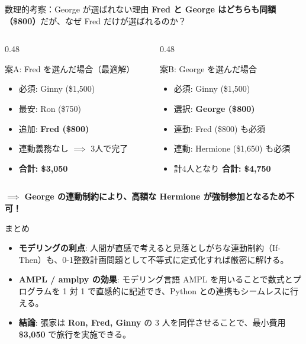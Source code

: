 \documentclass[aspectratio=169,11pt]{beamer}
\begin{document}
\begin{frame}{数理的考察：George が選ばれない理由}
  \textbf{Fred と George はどちらも同額（\$800）}だが、なぜ Fred だけが選ばれるのか？

  \begin{columns}[T]
    \begin{column}{0.48\textwidth}
      \begin{exampleblock}{案A: Fred を選んだ場合（最適解）}
        \begin{itemize}\footnotesize
          \item 必須: Ginny (\$1,500)
          \item 最安: Ron (\$750)
          \item 追加: \textbf{Fred (\$800)}
          \item 連動義務なし $\implies$ 3人で完了
          \item \textbf{合計: \$3,050}
        \end{itemize}
      \end{exampleblock}
    \end{column}
    \begin{column}{0.48\textwidth}
      \begin{alertblock}{案B: George を選んだ場合}
        \begin{itemize}\footnotesize
          \item 必須: Ginny (\$1,500)
          \item 選択: \textbf{George (\$800)}
          \item 連動: \alert{Fred (\$800) も必須}
          \item 連動: \alert{Hermione (\$1,650) も必須}
          \item 計4人となり \textbf{合計: \$4,750}
        \end{itemize}
      \end{alertblock}
    \end{column}
  \end{columns}

  \vspace{0.15cm}
  \centering
  \footnotesize
  \textbf{$\implies$ George の連動制約により、高額な Hermione が強制参加となるため不可！}
\end{frame}

\begin{frame}{まとめ}
  \begin{itemize}
    \item \textbf{モデリングの利点}:
      人間が直感で考えると見落としがちな連動制約（If-Then）も、0-1整数計画問題として不等式に定式化すれば厳密に解ける。
    \item \textbf{AMPL / amplpy の効果}:
      モデリング言語 AMPL を用いることで数式とプログラムを 1 対 1 で直感的に記述でき、Python との連携もシームレスに行える。
    \item \textbf{結論}:
      張家は \textbf{Ron, Fred, Ginny} の 3 人を同伴させることで、最小費用 \alert{\textbf{\$3,050}} で旅行を実施できる。
  \end{itemize}
\end{frame}
\end{document}
